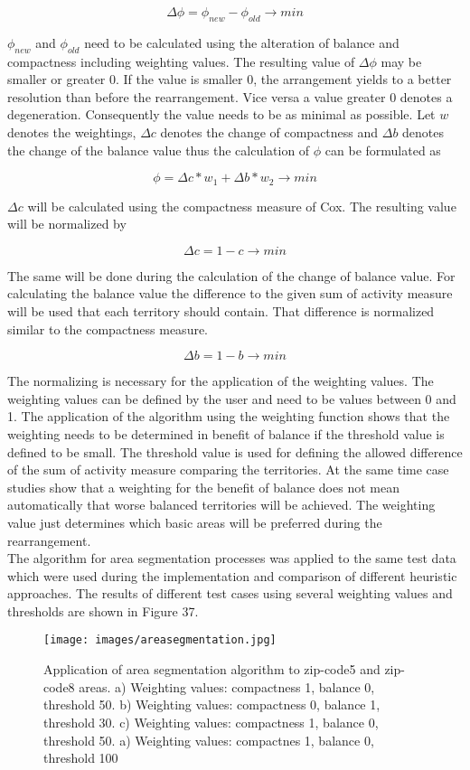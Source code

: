 \[ \mathit{\Delta \phi = \phi_{new}-\phi_{old} \to min}\]

$\phi_{new}$ and $\phi_{old}$ need to be calculated using the alteration of balance and compactness including weighting values. The resulting value of $\Delta \phi$ may be smaller or greater 0. If the value is smaller 0, the arrangement yields to a better resolution than before the rearrangement. Vice versa a value greater 0 denotes a degeneration. Consequently the value needs to be as minimal as possible. 
Let $w$ denotes the weightings, $\Delta c$ denotes the change of compactness and $\Delta b$ denotes the change of the balance value thus the calculation of $\phi$ can be formulated as

\[ \mathit{\phi = \Delta c * w_{1} + \Delta b * w_{2} \to min}\]

$\Delta c$ will be calculated using the compactness measure of Cox. The resulting value will be normalized by 

\[ \mathit{\Delta c = 1 - c \to min}\]

The same will be done during the calculation of the change of balance value. For calculating the balance value the difference to the given sum of activity measure will be used that each territory should contain. That difference is normalized similar to the compactness measure.

\[ \mathit{\Delta b = 1 - b \to min}\]

The normalizing is necessary for the application of the weighting values. The weighting values can be defined by the user and need to be values between 0 and 1. The application of the algorithm using the weighting function shows that the weighting needs to be determined in benefit of balance if the threshold value is defined to be small. The threshold value is used for defining the allowed difference of the sum of activity measure comparing the territories. At the same time case studies show that a weighting for the benefit of balance does not mean automatically that worse balanced territories will be achieved. The weighting value just determines which basic areas will be preferred during the rearrangement. \\ 
The algorithm for area segmentation processes was applied to the same test data which were used during the implementation and comparison of different heuristic approaches. The results of different test cases using several weighting values and thresholds are shown in Figure 37.

\begin{figure}[H]
	\centering
	\texttt{[image: images/areasegmentation.jpg]}
	\caption[Application of area segmentation algorithm to zip-code5 and zip-code8 areas.]{Application of area segmentation algorithm to zip-code5 and zip-code8 areas. a) Weighting values: compactness 1, balance 0, threshold 50. b) Weighting values: compactness 0, balance 1, threshold 30. c) Weighting values: compactness 1, balance 0, threshold 50. a) Weighting values: compactnes 1, balance 0, threshold 100}
\end{figure}

